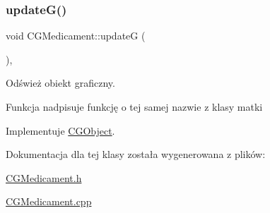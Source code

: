 \subsubsection{\texorpdfstring{update\+G()}{updateG()}}
{\footnotesize\ttfamily void C\+G\+Medicament\+::updateG (\begin{DoxyParamCaption}{ }\end{DoxyParamCaption})\hspace{0.3cm}{\ttfamily [override]}, {\ttfamily [virtual]}}



Odśwież obiekt graficzny. 

Funkcja nadpisuje funkcję o tej samej nazwie z klasy matki 

Implementuje \mbox{\hyperlink{class_c_g_object_a95e80549666e955edd57ab042c2e8ef5}{C\+G\+Object}}.



Dokumentacja dla tej klasy została wygenerowana z plików\+:\begin{DoxyCompactItemize}
\item 
\mbox{\hyperlink{_c_g_medicament_8h}{C\+G\+Medicament.\+h}}\item 
\mbox{\hyperlink{_c_g_medicament_8cpp}{C\+G\+Medicament.\+cpp}}\end{DoxyCompactItemize}
